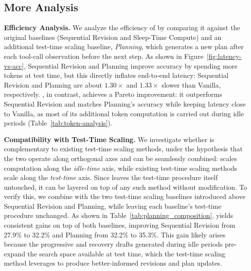 \subsection{More Analysis}\label{sec:ablation}

\textbf{Efficiency Analysis.}
We analyze the efficiency of \methodname{} by comparing it against the original baselines (Sequential Revision and Sleep-Time Compute) and an additional test-time scaling baseline, \emph{Planning}, which generates a new plan after each tool-call observation before the next step.
As shown in Figure~\ref{fig:latency-vs-acc}, Sequential Revision and Planning improve accuracy by spending more tokens at test time, but this directly inflates end-to-end latency: Sequential Revision and Planning are about $1.30\times$ and $1.33\times$ slower than Vanilla, respectively.
\methodname{}, in contrast, achieves a Pareto improvement: it outperforms Sequential Revision and matches Planning's accuracy while keeping latency close to Vanilla, as most of its additional token computation is carried out during idle periods (Table~\ref{tab:token-analysis}).


\textbf{Compatibility with Test-Time Scaling.}
We investigate whether \methodname{} is complementary to existing test-time scaling methods, under the hypothesis that the two operate along orthogonal axes and can be seamlessly combined: \methodname{} scales computation along the \emph{idle-time} axis, while existing test-time scaling methods scale along the \emph{test-time} axis.
Since \methodname{} leaves the test-time procedure itself untouched, it can be layered on top of any such method without modification.
To verify this, we combine \methodname{} with the two test-time scaling baselines introduced above Sequential Revision and Planning,  while leaving each baseline's test-time procedure unchanged. As shown in Table~\ref{tab:planning_composition}, \methodname{} yields consistent gains on top of both baselines, improving Sequential Revision from 27.9\% to 32.2\% and Planning from 32.2\% to 35.3\%.
This gain likely arises because the progressive and recovery drafts generated during idle periods pre-expand the search space available at test time, which the test-time scaling method leverages to produce better-informed revisions and plan updates.


